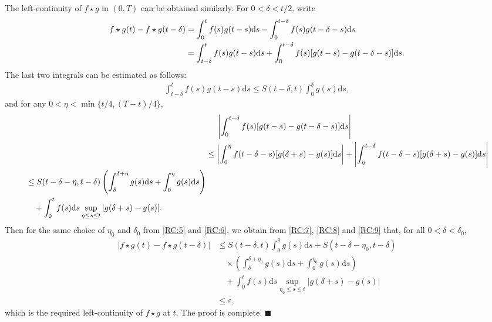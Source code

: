\documentclass[12pt, twoside]{article}
\numberwithin{figure}{section}
\newcommand{\1}{\mathds 1}
\newcommand{\vep}{{\varepsilon}}
\renewcommand{\d}{{\mathrm d}}
\newcommand{\2}{{\mathbf 1}}
\renewenvironment{proof}[1][\proofname]{\noindent {\bfseries #1.}\;}{\hfill\ensuremath{\blacksquare}\\}
\begin{document}
\begin{proof}
The left-continuity of $f\star g$ in $(0,T)$ can be obtained similarly. For $0<\delta<t/2$, write
\begin{align}
f\star g(t)-f\star g(t-\delta)&=\int_0^{t} f(s)g(t-s)\d s-\int_0^{t-\delta} f(s)g(t-\delta-s)\d s\notag\\
&=\int_{t-\delta}^{t} f(s)g(t-s)\d s+\int_0^{t-\delta} f(s)[g(t-s)-g(t-\delta-s)]\d s.\label{RC:7}
\end{align}
The last two integrals can be estimated as follows: 
\begin{align}
\int_{t-\delta}^{t} f(s)g(t-s)\d s\leq S(t-\delta,t)\int_0^\delta g(s)\d s,\label{RC:8}
\end{align}
and for any $0<\eta<\min\{t/4,(T-t)/4\}$, 
\begin{align}
&\quad\;\left|\int_0^{t-\delta} f(s)[g(t-s)-g(t-\delta-s)]\d s\right|\notag\\
&\leq \left|\int_0^\eta f(t-\delta-s)[g(\delta+s)-g(s)]\d s\right|+\left|
\int_\eta^{t-\delta} f(t-\delta-s)[g(\delta+s)-g(s)]\d s\right|\notag\\
\begin{split}
&\leq S(t-\delta-\eta,t-\delta)\left(\int_{\delta}^{\delta+\eta}g(s)\d s+\int_0^{\eta}g(s)\d s\right)\\
&\quad+ \int_0^{t}f(s)\d s\sup_{\eta\leq s\leq t}|g(\delta+s)-g(s)|.\label{RC:9}
\end{split}
\end{align}
Then for the same choice of $\eta_0$ and $\delta_0$ from \eqref{RC:5} and \eqref{RC:6}, we obtain from \eqref{RC:7}, \eqref{RC:8} and \eqref{RC:9} that, for all $0<\delta<\delta_0$, 
\begin{align*}
|f\star g(t)-f\star g(t-\delta)|&\leq S(t-\delta,t)\int_0^\delta g(s)\d s+S(t-\delta-\eta_0,t-\delta)\\
&\quad \times\left(\int_{\delta}^{\delta+\eta_0}g(s)\d s+\int_0^{\eta_0}g(s)\d s\right)\\
&\quad+ \int_0^{t}f(s)\d s\sup_{\eta_0\leq s\leq t}|g(\delta+s)-g(s)|\\
&\leq \vep,
\end{align*}
which is the required left-continuity of $f\star g$ at $t$. The proof is complete.
\end{proof}
\end{document}
